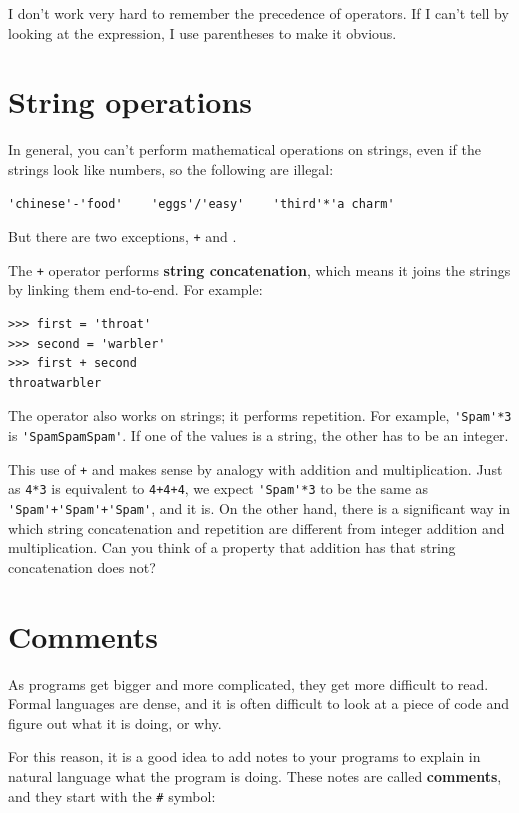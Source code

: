 \documentclass[10pt]{book}
\begin{document}
I don't work very hard to remember the precedence of
operators.  If I can't tell by looking at the expression, I use
parentheses to make it obvious.


\section{String operations}

In general, you can't perform mathematical operations on strings, even
if the strings look like numbers, so the following are illegal:

\begin{verbatim}
'chinese'-'food'    'eggs'/'easy'    'third'*'a charm'
\end{verbatim}
%
But there are two exceptions, {\tt +} and {\tt *}.

The {\tt +} operator performs {\bf string concatenation}, which means
it joins the strings by linking them end-to-end.  For example:

\begin{verbatim}
>>> first = 'throat'
>>> second = 'warbler'
>>> first + second
throatwarbler
\end{verbatim}
%
The {\tt *} operator also works on strings; it performs repetition.
For example, \verb"'Spam'*3" is \verb"'SpamSpamSpam'".  If one of the
values is a string, the other has to be an integer.

This use of {\tt +} and {\tt *} makes sense by
analogy with addition and multiplication.  Just as {\tt 4*3} is
equivalent to {\tt 4+4+4}, we expect \verb"'Spam'*3" to be the same as
\verb"'Spam'+'Spam'+'Spam'", and it is.  On the other hand, there is a
significant way in which string concatenation and repetition are
different from integer addition and multiplication.
Can you think of a property that addition has
that string concatenation does not?


\section{Comments}

As programs get bigger and more complicated, they get more difficult
to read.  Formal languages are dense, and it is often difficult to
look at a piece of code and figure out what it is doing, or why.

For this reason, it is a good idea to add notes to your programs to explain
in natural language what the program is doing.  These notes are called
{\bf comments}, and they start with the \verb"#" symbol:
\end{document}
